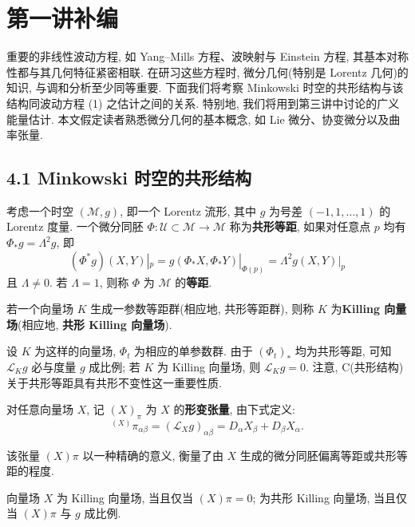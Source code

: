 \chapter{第一讲补编}

重要的非线性波动方程, 如 Yang--Mills 方程、波映射与 Einstein 方程, 其基本对称性都与其几何特征紧密相联. 在研习这些方程时, 微分几何(特别是 Lorentz 几何)的知识, 与调和分析至少同等重要. 下面我们将考察 Minkowski 时空的共形结构与该结构同波动方程 (1) 之估计之间的关系. 特别地, 我们将用到第三讲中讨论的广义能量估计. 本文假定读者熟悉微分几何的基本概念, 如 Lie 微分、协变微分以及曲率张量.
\section*{4.1 Minkowski 时空的共形结构}

\setcounter{mtthm}{1}%

\begin{definition}\label{def:4.2}
考虑一个时空 $(\mathcal{M}, g)$, 即一个 Lorentz 流形, 其中 $g$ 为号差 $(-1,1,\ldots,1)$ 的 Lorentz 度量.
一个微分同胚 $\Phi:\mathcal{U}\subset\mathcal{M}\to\mathcal{M}$ 称为\textbf{共形等距}, 如果对任意点 $p$ 均有 $\Phi_* g=\Lambda^2 g$, 即
\begin{equation}
(\Phi^* g)(X,Y)|_p=g(\Phi_* X,\Phi_* Y)|_{\Phi(p)}=\Lambda^2 g(X,Y)|_p
\end{equation}
且 $\Lambda\neq 0$. 若 $\Lambda=1$, 则称 $\Phi$ 为 $\mathcal{M}$ 的\textbf{等距}.\end{definition}

\begin{definition}\label{def:4.3}
若一个向量场 $K$ 生成一参数等距群(相应地, 共形等距群), 则称 $K$ 为\textbf{Killing 向量场}(相应地, \textbf{共形 Killing 向量场}).\end{definition}

设 $K$ 为这样的向量场, $\Phi_t$ 为相应的单参数群. 由于 $(\Phi_t)_*$ 均为共形等距, 可知 $\mathcal{L}_K g$ 必与度量 $g$ 成比例; 若 $K$ 为 Killing 向量场, 则 $\mathcal{L}_K g=0$.
注意, C(共形结构)关于共形等距具有共形不变性这一重要性质.
\begin{definition}\label{def:4.4}
对任意向量场 $X$, 记 $(X)_\pi$ 为 $X$ 的\textbf{形变张量}, 由下式定义:
\begin{equation}
{}^{(X)}\pi_{\alpha\beta}=(\mathcal{L}_X g)_{\alpha\beta}=D_\alpha X_\beta+D_\beta X_\alpha.\end{equation}
\end{definition}

该张量 $(X)\pi$ 以一种精确的意义, 衡量了由 $X$ 生成的微分同胚偏离等距或共形等距的程度.
\begin{proposition}\label{prop:4.5}
向量场 $X$ 为 Killing 向量场, 当且仅当 $(X)\pi=0$; 为共形 Killing 向量场, 当且仅当 $(X)\pi$ 与 $g$ 成比例.\end{proposition}

